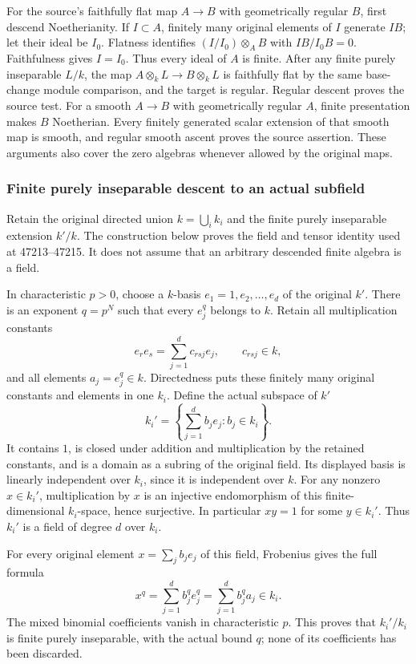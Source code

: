 For the source's faithfully flat map \(A\to B\) with geometrically regular \(B\), first descend Noetherianity. If \(I\subset A\), finitely many original elements of \(I\) generate \(IB\); let their ideal be \(I_0\). Flatness identifies \((I/I_0)\otimes_AB\) with \(IB/I_0B=0\). Faithfulness gives \(I=I_0\). Thus every ideal of \(A\) is finite. After any finite purely inseparable \(L/k\), the map \(A\otimes_kL\to B\otimes_kL\) is faithfully flat by the same base-change module comparison, and the target is regular. Regular descent proves the source test. For a smooth \(A\to B\) with geometrically regular \(A\), finite presentation makes \(B\) Noetherian. Every finitely generated scalar extension of that smooth map is smooth, and regular smooth ascent proves the source assertion. These arguments also cover the zero algebras whenever allowed by the original maps.

\subsubsection{Finite purely inseparable descent to an actual subfield}\label{algebra-proof-071-finite-purely-inseparable-descent-to-an-actual-subfield}

Retain the original directed union \(k=\bigcup_i k_i\) and the finite purely inseparable extension \(k'/k\). The construction below proves the field and tensor identity used at 47213--47215. It does not assume that an arbitrary descended finite algebra is a field.

In characteristic \(p>0\), choose a \(k\)-basis \(e_1=1,e_2,\ldots,e_d\) of the original \(k'\). There is an exponent \(q=p^N\) such that every \(e_j^q\) belongs to \(k\). Retain all multiplication constants \[
 e_re_s=\sum_{j=1}^d c_{rsj}e_j,\qquad c_{rsj}\in k,
\] and all elements \(a_j=e_j^q\in k\). Directedness puts these finitely many original constants and elements in one \(k_i\). Define the actual subspace of \(k'\) \[
 k_i'=\left\{\sum_{j=1}^d b_je_j:b_j\in k_i\right\}.
\] It contains \(1\), is closed under addition and multiplication by the retained constants, and is a domain as a subring of the original field. Its displayed basis is linearly independent over \(k_i\), since it is independent over \(k\). For any nonzero \(x\in k_i'\), multiplication by \(x\) is an injective endomorphism of this finite-dimensional \(k_i\)-space, hence surjective. In particular \(xy=1\) for some \(y\in k_i'\). Thus \(k_i'\) is a field of degree \(d\) over \(k_i\).

For every original element \(x=\sum_jb_je_j\) of this field, Frobenius gives the full formula \[
 x^q=\sum_{j=1}^d b_j^q e_j^q=\sum_{j=1}^d b_j^q a_j\in k_i.
\] The mixed binomial coefficients vanish in characteristic \(p\). This proves that \(k_i'/k_i\) is finite purely inseparable, with the actual bound \(q\); none of its coefficients has been discarded.

